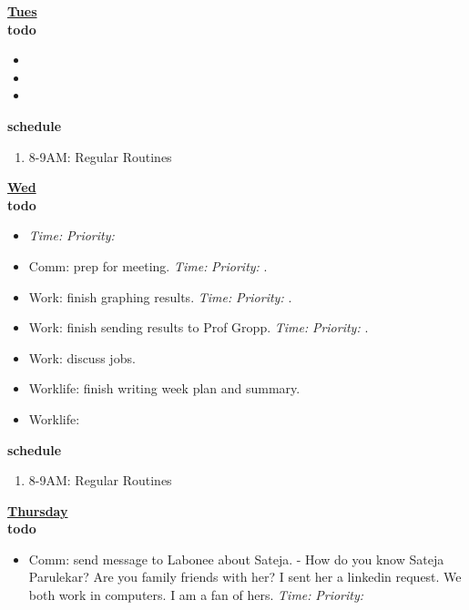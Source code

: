 \documentclass[11pt]{article}
\newcommand{\timeEst}[1]{\textit{Time:} \textit{#1}}
\newcommand{\priority}[1]{\textit{Priority:} \textit{#1}}
\newcommand{\deadline}[1]{#1}
\begin{document}
{\textbf{\small \underline{Tues}} \\
\textbf{\small todo} \\
\begin{itemize}
  \tiny \item \tiny 
  \tiny \item \tiny 
  \tiny \item \tiny 
\end{itemize}
\textbf{\small schedule} \\
  \begin{enumerate}
    \tiny \item \tiny 8-9AM: Regular Routines 
  \end{enumerate} 
\textbf{\small \underline{Wed}} \\
\textbf{\small todo} \\
\begin{itemize}
\tiny \item \tiny \deadline{} \timeEst{} \priority{} 
  \tiny \item \tiny Comm: prep for meeting. \deadline{} \timeEst{} \priority{}. 
  \item \tiny Work: finish graphing results.  \deadline{ }   \timeEst{}  \priority{}.
  \item \tiny Work: finish sending results to Prof Gropp.  \deadline{ }   \timeEst{}  \priority{}. 
  \item \tiny Work: discuss jobs.  
  \item \tiny Worklife: finish writing week plan and summary. 
  \item \tiny Worklife: 
\end{itemize} 
\textbf{\small schedule} \\
  \begin{enumerate}
    \tiny \item \tiny 8-9AM: Regular Routines 
  \end{enumerate} 
  \textbf{\small \underline{Thursday}} \\
  \textbf{\small todo} \\
  \begin{itemize}
    \tiny \item \tiny Comm: send message to Labonee about Sateja. - How do you know Sateja Parulekar? Are you family friends with her? I sent her a linkedin request. We both work in computers. I am a fan of hers. 
    \deadline{} \timeEst{} \priority{}  

\end{itemize}}
\end{document}

